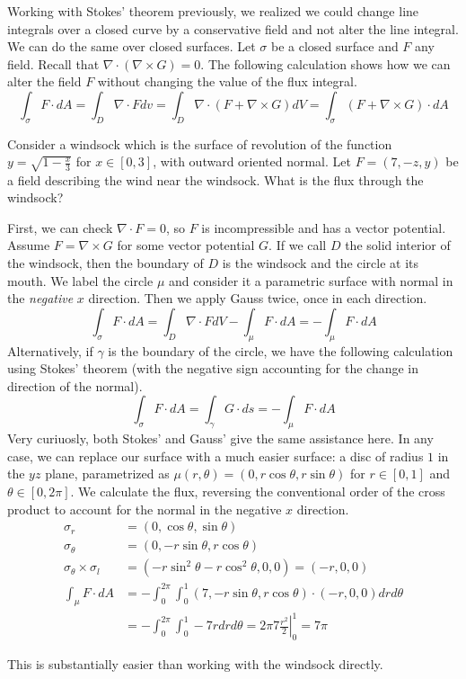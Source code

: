 \documentclass[fleqn,letterpaper]{report}
\begin{document}
Working with Stokes' theorem previously, we realized we could
change line integrals over a closed curve by a conservative
field and not alter the line integral. We can do the same over
closed surfaces. Let $\sigma$ be a closed surface and $F$ any
field. Recall that $\nabla \cdot (\nabla \times G ) = 0$. The
following calculation shows how we can alter the field $F$
without changing the value of the flux integral.
\begin{equation*}
\int_\sigma F \cdot dA = \int_D \nabla \cdot F dv = \int_D
\nabla \cdot (F + \nabla \times G) dV = \int_{\sigma} (F +
\nabla \times G) \cdot dA
\end{equation*}

\begin{example}
Consider a windsock which is the surface
of revolution of the function $y = \sqrt{1 - \frac{x}{3}}$ for
$x \in [0,3]$, with outward oriented normal. Let $F = (7, -z,
y)$ be a field describing the wind near the windsock. What is
the flux through the windsock?

First, we can check $\nabla \cdot F = 0$, so $F$ is
incompressible and has a vector potential. Assume $F = \nabla
\times G$ for some vector potential $G$. If we call $D$ the
solid interior of the windsock, then the boundary of $D$ is
the windsock and the circle at its mouth. We label the circle
$\mu$ and consider it a parametric surface with normal in
the \emph{negative} $x$ direction. Then we apply Gauss twice,
once in each direction.
\begin{equation*}
\int_{\sigma} F \cdot dA = \int_{D} \nabla \cdot F dV -
\int_\mu F \cdot dA = -\int_\mu F \cdot dA
\end{equation*}
Alternatively, if $\gamma$ is the boundary of the circle, we
have the following calculation using Stokes' theorem (with the
negative sign accounting for the change in direction of the
normal). 
\begin{equation*}
\int_\sigma F \cdot dA = \int_\gamma G \cdot ds = -\int_\mu
F \cdot dA
\end{equation*}
Very curiuosly, both Stokes' and Gauss' give the same
assistance here. In any case, we can replace our surface with
a much easier surface: a disc of radius $1$ in the $yz$
plane, parametrized as $\mu(r,\theta) = (0, r\cos \theta, r \sin
\theta)$ for $r \in [0,1]$ and $\theta \in [0, 2\pi]$. We
calculate the flux, reversing the conventional order of the cross
product to account for the normal in the negative $x$
direction.
\begin{align*}
\sigma_r & = (0, \cos \theta, \sin \theta) \\
\sigma_\theta & = (0, -r\sin \theta, r \cos \theta) \\
\sigma_\theta \times \sigma_l & = (-r\sin^2 \theta - r \cos^2
\theta, 0 ,0) = (-r,0,0) \\
\int_\mu F \cdot dA & = -\int_0^{2\pi} \int_0^1 (7, -r\sin
\theta, r \cos \theta) \cdot (-r, 0, 0) dr d\theta \\
& = -\int_0^{2\pi} \int_0^1 -7rdr d\theta = 2\pi 7 \left.
\frac{r^2}{2} \right|_0^1 = 7\pi 
\end{align*}

This is substantially easier than working with the windsock
directly.
\end{example}
\end{document}
